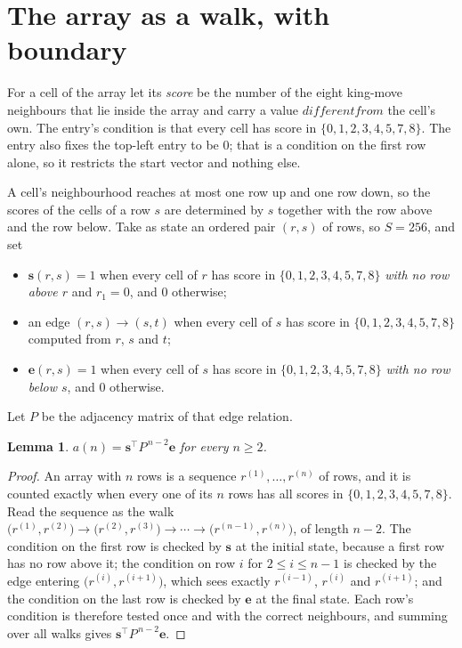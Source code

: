 \documentclass[11pt,a4paper]{article}
\theoremstyle{plain}
\newtheorem{lemma}[theorem]{Lemma}
\theoremstyle{definition}
\begin{document}
\section{The array as a walk, with boundary}

For a cell of the array let its \emph{score} be the number of the eight king-move neighbours that lie inside
the array and carry a value $different from$ the cell's own. The entry's condition is that every cell
has score in $\{0,1,2,3,4,5,7,8\}$. The entry also fixes the top-left entry to be $0$; that is a condition on the first row alone, so it restricts the start vector and nothing else.

A cell's neighbourhood reaches at most one row up and one row down, so the scores of the
cells of a row $s$ are determined by $s$ together with the row above and the row below.
Take as state an ordered pair $(r,s)$ of rows, so $S=256$, and set
\begin{itemize}
\item $\mathbf{s}(r,s)=1$ when every cell of $r$ has score in $\{0,1,2,3,4,5,7,8\}$ \emph{with no row
above $r$} and $r_1=0$, and $0$ otherwise;
\item an edge $(r,s)\to(s,t)$ when every cell of $s$ has score in $\{0,1,2,3,4,5,7,8\}$ computed from
$r$, $s$ and $t$;
\item $\mathbf{e}(r,s)=1$ when every cell of $s$ has score in $\{0,1,2,3,4,5,7,8\}$ \emph{with no row
below $s$}, and $0$ otherwise.
\end{itemize}
Let $P$ be the adjacency matrix of that edge relation.

\begin{lemma}\label{lem:walk}
$a(n)=\mathbf{s}^{\!\top}P^{\,n-2}\mathbf{e}$ for every $n\ge2$.
\end{lemma}

\begin{proof}
An array with $n$ rows is a sequence $r^{(1)},\dots,r^{(n)}$ of rows, and it is counted
exactly when every one of its $n$ rows has all scores in $\{0,1,2,3,4,5,7,8\}$. Read the sequence as the
walk $\bigl(r^{(1)},r^{(2)}\bigr)\to\bigl(r^{(2)},r^{(3)}\bigr)\to\cdots\to
\bigl(r^{(n-1)},r^{(n)}\bigr)$, of length $n-2$. The condition on the first row is
checked by $\mathbf{s}$ at the initial state, because a first row has no row above it; the
condition on row $i$ for $2\le i\le n-1$ is checked by the edge entering
$\bigl(r^{(i)},r^{(i+1)}\bigr)$, which sees exactly $r^{(i-1)}$, $r^{(i)}$ and
$r^{(i+1)}$; and the condition on the last row is checked by $\mathbf{e}$ at the final
state. Each row's condition is therefore tested once and with the correct neighbours, and
summing over all walks gives $\mathbf{s}^{\!\top}P^{\,n-2}\mathbf{e}$.
\end{proof}
\end{document}
